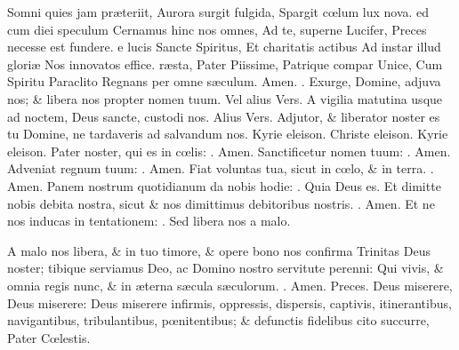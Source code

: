 \documentclass[letter,11pt]{book}
\makeatletter
\DeclareRobustCommand{\Vbar}{\vers@resp{-0.1em}{V}}
\DeclareRobustCommand{\Rbar}{\vers@resp{0pt}{R}}
\newcommand{\vers@resp@sym}{\raisebox{0.2ex}{\rotatebox[origin=c]{-20}{$\m@th\rceil$}}}
\newcommand{\vers@resp}[2]{%
  {\ooalign{\hidewidth\kern#1\vers@resp@sym\hidewidth\cr#2\cr}}%
}%
\def\V{\color{Red} \Vbar . \color{black}}
\def\R{\color{Red} \Rbar . \color{black}}
\makeatother
\begin{document}
\begin{multicols*}{2}
\newline Somni quies jam pr\ae teriit,
\newline \indent Aurora surgit fulgida,
\newline \indent Spargit c\oe lum lux nova.
ed cum diei speculum
\newline \indent Cernamus hinc nos omnes,
\newline \indent Ad te, superne Lucifer,
\newline \indent Preces necesse est fundere.
e lucis Sancte Spiritus,
\newline \indent Et charitatis actibus
\newline \indent Ad instar illud glori\ae 
\newline \indent Nos innovatos effice.
r\ae sta, Pater Piissime,
\newline \indent Patrique compar Unice,
\newline \indent Cum Spiritu Paraclito
\newline \indent Regnans per omne s\ae culum.
\newline \indent \indent Amen.
\newline \V Exurge, Domine, adjuva nos; \& libera nos propter nomen tuum.
\newline \color{Red} Vel alius Vers. \color{black} A vigilia matutina usque ad noctem, Deus sancte, custodi nos.
\newline \color{Red} Alius Vers. \color{black} Adjutor, \& liberator noster es tu Domine, ne tardaveris ad salvandum nos.
\newline Kyrie eleison. Christe eleison. Kyrie eleison. Pater noster, qui es in c\oe lis: \R Amen. Sanctificetur nomen tuum: \R Amen. Adveniat regnum tuum: \R Amen. Fiat voluntas tua, sicut in c\oe lo, \& in terra. \R Amen. Panem nostrum quotidianum da nobis hodie: \R Quia Deus es. Et dimitte nobis debita nostra, sicut \& nos dimittimus debitoribus nostris. \R Amen. Et ne nos inducas in tentationem: \R Sed libera nos a malo. 
\par A malo nos libera, \& in tuo timore, \& opere bono nos confirma Trinitas Deus noster; tibique serviamus Deo, ac Domino nostro servitute perenni: Qui vivis, \& omnia regis nunc, \& in \ae terna s\ae cula s\ae culorum. \R Amen.
\newline \color{Red} Preces. \color{black} Deus miserere, Deus miserere: Deus miserere infirmis, oppressis, dispersis, captivis, itinerantibus, navigantibus, tribulantibus, p\oe nitentibus; \& defunctis fidelibus cito succurre, Pater C\oe lestis.

\end{multicols*}
\end{document}
